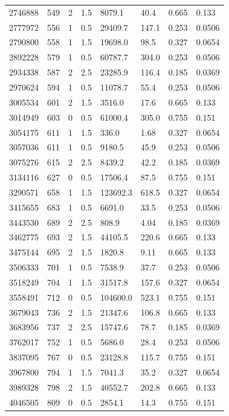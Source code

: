 \documentclass[preview]{standalone}
\begin{document}
{{{\begin{tabular}{L{1.2cm}C{1.2cm} C{0.3cm}C{0.5cm} C{1.4cm}C{1.4cm} C{1.4cm}C{1.4cm}}
  2746888  &   549  & 2     & 1.5 &  8079.1  & 40.4  & 0.665 &  0.133   \\ 
  2777972  &   556  & 1     & 0.5 &  29409.7  & 147.1  & 0.253 &  0.0506   \\ 
  2790800  &   558  & 1     & 1.5 &  19698.0  & 98.5  & 0.327 &  0.0654   \\ 
  2892228  &   579  & 1     & 0.5 &  60787.7  & 304.0  & 0.253 &  0.0506   \\ 
  2934338  &   587  & 2     & 2.5 &  23285.9  & 116.4  & 0.185 &  0.0369   \\ 
  2970624  &   594  & 1     & 0.5 &  11078.7  & 55.4  & 0.253 &  0.0506   \\ 
  3005534  &   601  & 2     & 1.5 &  3516.0  & 17.6  & 0.665 &  0.133   \\ 
  3014949  &   603  & 0     & 0.5 &  61000.4  & 305.0  & 0.755 &  0.151   \\ 
  3054175  &   611  & 1     & 1.5 &  336.0  & 1.68  & 0.327 &  0.0654   \\ 
  3057036  &   611  & 1     & 0.5 &  9180.5  & 45.9  & 0.253 &  0.0506   \\ 
  3075276  &   615  & 2     & 2.5 &  8439.2  & 42.2  & 0.185 &  0.0369   \\ 
  3134116  &   627  & 0     & 0.5 &  17506.4  & 87.5  & 0.755 &  0.151   \\ 
  3290571  &   658  & 1     & 1.5 &  123692.3  & 618.5  & 0.327 &  0.0654   \\ 
  3415655  &   683  & 1     & 0.5 &  6691.0  & 33.5  & 0.253 &  0.0506   \\ 
  3443530  &   689  & 2     & 2.5 &  808.9  & 4.04  & 0.185 &  0.0369   \\ 
  3462775  &   693  & 2     & 1.5 &  44105.5  & 220.6  & 0.665 &  0.133   \\ 
  3475144  &   695  & 2     & 1.5 &  1820.8  & 9.11  & 0.665 &  0.133   \\ 
  3506333  &   701  & 1     & 0.5 &  7538.9  & 37.7  & 0.253 &  0.0506   \\ 
  3518249  &   704  & 1     & 1.5 &  31517.8  & 157.6  & 0.327 &  0.0654   \\ 
  3558491  &   712  & 0     & 0.5 &  104600.0  & 523.1  & 0.755 &  0.151   \\ 
  3679043  &   736  & 2     & 1.5 &  21347.6  & 106.8  & 0.665 &  0.133   \\ 
  3683956  &   737  & 2     & 2.5 &  15747.6  & 78.7  & 0.185 &  0.0369   \\ 
  3762017  &   752  & 1     & 0.5 &  5686.0  & 28.4  & 0.253 &  0.0506   \\ 
  3837095  &   767  & 0     & 0.5 &  23128.8  & 115.7  & 0.755 &  0.151   \\ 
  3967800  &   794  & 1     & 1.5 &  7041.3  & 35.2  & 0.327 &  0.0654   \\ 
  3989328  &   798  & 2     & 1.5 &  40552.7  & 202.8  & 0.665 &  0.133   \\ 
  4046505  &   809  & 0     & 0.5 &  2854.1  & 14.3  & 0.755 &  0.151   \\ 
\hline 
\end{tabular} 

}}}
\end{document}
